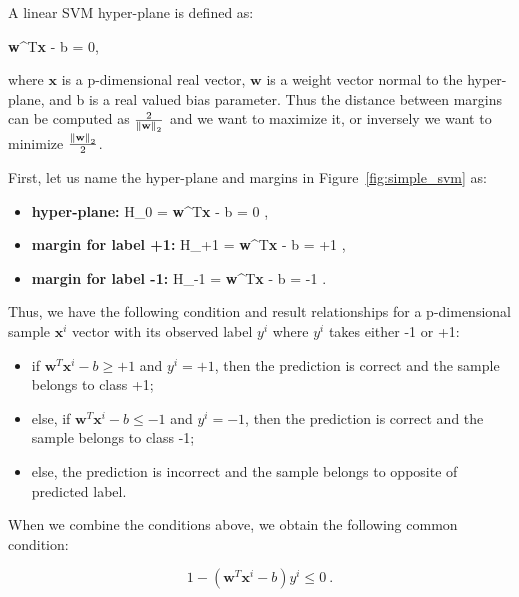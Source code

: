 A linear SVM hyper-plane is defined as:

\be
\label{eq:linear_hyperplane}
\textbf{w}^{T}\textbf{x} - b = 0,
\ee

where $\textbf{x}$ is a p-dimensional real vector, $\textbf{w}$ is a weight vector normal to the hyper-plane, and b is a real valued bias parameter. Thus the distance between margins can be computed as $\frac{2}{\left\lVert\textbf{w}\right\rVert_{2}}$ and we want to maximize it, or inversely we want to minimize $\frac{\left\lVert\textbf{w}\right\rVert_{2}}{2}$.


First, let us name the hyper-plane and margins in Figure~\ref{fig:simple_svm} as:

\begin{itemize}
	\item \textbf{hyper-plane:} 
	\be \label{h0_formula} H_{0} = \textbf{w}^{T}\textbf{x} - b = 0 \:,\ee
	\item \textbf{margin for label +1:}
	\be \label{h+1_formula} H_{+1} = \textbf{w}^{T}\textbf{x} - b = +1 \:,\:\ee
	\item \textbf{margin for label -1:}
	\be \label{h-1_formula} H_{-1} = \textbf{w}^{T}\textbf{x} - b = -1 \:.\ee
\end{itemize}

Thus, we have the following condition and result relationships for a p-dimensional sample $\textbf{x}^{i}$ vector with its observed label $y^{i}$ where $y^{i}$ takes either -1 or +1:

\begin{itemize}
	\item if $\textbf{w}^{T}\textbf{x}^{i} - b \geq +1$ and $y^{i} = +1$, then the prediction is correct and the sample belongs to class +1;
	\item else, if $\textbf{w}^{T}\textbf{x}^{i} - b \leq -1$ and $y^{i} = -1$, then the prediction is correct and the sample belongs to class -1;
	\item else, the prediction is incorrect and the sample belongs to opposite of predicted label.
\end{itemize}

When we combine the conditions above, we obtain the following common condition:

\begin{equation}
	\label{common_loss} 
	1 - (\textbf{w}^{T}\textbf{x}^{i} - b)y^{i} \leq 0\:.
\end{equation}

